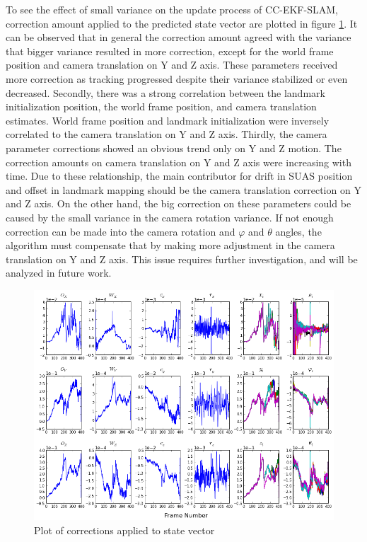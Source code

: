 To see the effect of small variance on the update process of
CC-EKF-SLAM, correction amount applied to the predicted state vector
are plotted in figure \ref{fltfig:4}. It can be observed that in
general the correction amount agreed with the variance that bigger
variance resulted in more correction, except for the world frame
position and camera translation on Y and Z axis. These parameters
received more correction as tracking progressed despite their variance
stabilized or even decreased. Secondly, there was a strong correlation
between the landmark initialization position, the world frame
position, and camera translation estimates. World frame position and
landmark initialization were inversely correlated to the camera
translation on Y and Z axis. Thirdly, the camera parameter corrections
showed an obvious trend only on Y and Z motion. The correction amounts
on camera translation on Y and Z axis were increasing with time. Due
to these relationship, the main contributor for drift in SUAS position
and offset in landmark mapping should be the camera translation
correction on Y and Z axis. On the other hand, the big correction on
these parameters could be caused by the small variance in the camera
rotation variance. If not enough correction can be made into the
camera rotation and $\varphi$ and $\theta$ angles, the algorithm must
compensate that by making more adjustment in the camera translation on
Y and Z axis. This issue requires further investigation, and will be
analyzed in future work.

\begin{figure}[h]
\centering
\includegraphics[width=15cm, keepaspectratio=true]
{./Figures/fltfig/cut1/Figure112.png}
\caption{Plot of corrections applied to state vector}
\label{fltfig:4}
\end{figure}
\FloatBarrier

